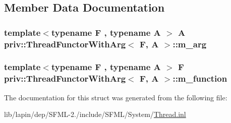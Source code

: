 \subsection{Member Data Documentation}
\hypertarget{structpriv_1_1_thread_functor_with_arg_ac598f7701f976320bc3964733b9ae9ae}{
\subsubsection[{m\-\_\-arg}]{\setlength{\rightskip}{0pt plus 5cm}template$<$typename F , typename A $>$ A {\bf priv\-::\-Thread\-Functor\-With\-Arg}$<$ F, A $>$\-::m\-\_\-arg}}\label{structpriv_1_1_thread_functor_with_arg_ac598f7701f976320bc3964733b9ae9ae}
\hypertarget{structpriv_1_1_thread_functor_with_arg_ab12992af3112f15df4b6f0dbce3137b9}{
\subsubsection[{m\-\_\-function}]{\setlength{\rightskip}{0pt plus 5cm}template$<$typename F , typename A $>$ F {\bf priv\-::\-Thread\-Functor\-With\-Arg}$<$ F, A $>$\-::m\-\_\-function}}\label{structpriv_1_1_thread_functor_with_arg_ab12992af3112f15df4b6f0dbce3137b9}


The documentation for this struct was generated from the following file\-:\begin{DoxyCompactItemize}
\item 
lib/lapin/dep/\-S\-F\-M\-L-\/2./include/\-S\-F\-M\-L/\-System/\hyperlink{lapin_2dep_2_s_f_m_l-2_83_2include_2_s_f_m_l_2_system_2_thread_8inl}{Thread.\-inl}\end{DoxyCompactItemize}

